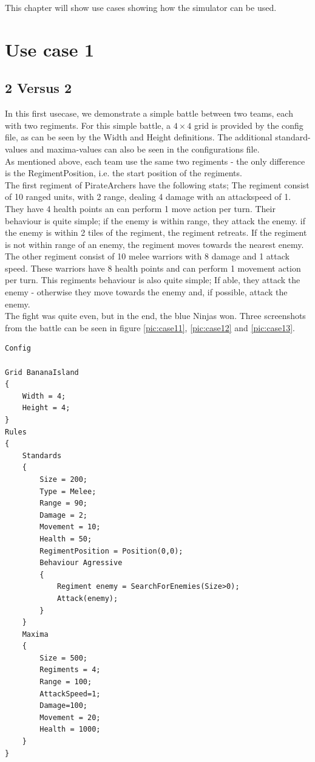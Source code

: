 This chapter will show use cases showing how the simulator can be used.

\section{Use case 1}\label{sec:usecase1}
	\subsection*{2 Versus 2}
	In this first usecase, we demonstrate a simple battle between two teams, each with two regiments. For this simple battle, a $4\times4$ grid is provided by the config file, as can be seen by the Width and Height definitions. The additional standard-values and maxima-values can also be seen in the configurations file.\\
	As mentioned above, each team use the same two regiments - the only difference is the RegimentPosition, i.e. the start position of the regiments. \\
	The first regiment of PirateArchers have the following stats; The regiment consist of 10 ranged units, with 2 range, dealing 4 damage with an attackspeed of 1. They have 4 health points an can perform 1 move action per turn. Their behaviour is quite simple; if the enemy is within range, they attack the enemy. if the enemy is within 2 tiles of the regiment, the regiment retreats. If the regiment is not within range of an enemy, the regiment moves towards the nearest enemy.\\
	The other regiment consist of 10 melee warriors with 8 damage and 1 attack speed. These warriors have 8 health points and can perform 1 movement action per turn. This regiments behaviour is also quite simple; If able, they attack the enemy - otherwise they move towards the enemy and, if possible, attack the enemy.\\
	The fight was quite even, but in the end, the blue Ninjas won. Three screenshots from the battle can be seen in figure \ref{pic:case11}, \ref{pic:case12} and \ref{pic:case13}.
\begin{lstlisting}
Config

Grid BananaIsland
{
	Width = 4;
	Height = 4;
}
Rules
{
	Standards
	{
		Size = 200;
		Type = Melee;
		Range = 90;
		Damage = 2;
		Movement = 10;
		Health = 50;
		RegimentPosition = Position(0,0);
		Behaviour Agressive
		{
			Regiment enemy = SearchForEnemies(Size>0);
			Attack(enemy);
		}
	}
	Maxima
	{
		Size = 500;
		Regiments = 4;
		Range = 100;
		AttackSpeed=1;
		Damage=100;
		Movement = 20;
		Health = 1000;
	}
}
\end{lstlisting}
